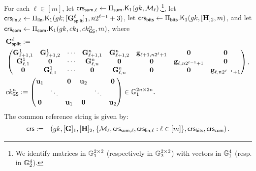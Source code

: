 \begin{description}
For each $\ell\in[m]$, let
\(\mathsf{crs}_{\mathsf{sum},\ell} \gets \Pi_{\mathsf{sum}}.\mathsf{K}_1({gk}, \mathcal{M}_\ell)\).\footnote{We identify
matrices in \(\mathbb{G}_1^{2 \times 2}\) (respectively in \(\mathbb{G}_2^{2 \times 2}\)) with vectors in \(\mathbb{G}_1^{4}\) (resp. in \(\mathbb{G}_2^{4}\)).}, let \(\mathsf{crs}_{\mathsf{lin},\ell}\gets \Pi_\mathsf{lin}.\mathsf{K}_1(gk;\allowbreak[\mathbf{{G}}^\ell_{\mathsf{split}}]_1,n2^{\ell-1}+3)\), let \(\mathsf{crs}_{\mathsf{bits}}\gets\Pi_{\mathsf{bits}}.\mathsf{K}_1(gk,[\mathbf{{H}}]_2,m)\), and let \(\mathsf{crs}_{\mathsf{com}} \gets \Pi_{\mathsf{com}}.\mathsf{K}_1({gk}, ck_1,ck_{\mathsf{GS}}^n,m)\), where
\begin{align*}
&\mathbf{{G}}_\mathsf{split}^\ell:=\\
&\begin{pmatrix}
\mathbf{{G}}^1_{\ell+1,1} & \mathbf{{G}}^1_{\ell+1,2} & \cdots & \mathbf{{G}}^n_{\ell+1,1} & \mathbf{{G}}^n_{\ell+1,2} & \mathbf{g}_{\ell+1,n2^\ell+1} & \mathbf{{0}}                       & \mathbf{{0}}\\
\mathbf{{G}}^1_{\ell,1}   & \mathbf{{0}}              & \cdots & \mathbf{{G}}^n_{\ell,n}   & \mathbf{{0}}              & \mathbf{{0}}                  & \mathbf{g}_{\ell,n2^{\ell-1}+1}  & \mathbf{{0}}\\
\mathbf{{0}}              & \mathbf{{G}}^1_{\ell,1}   & \cdots & \mathbf{{0}}              & \mathbf{{G}}^n_{\ell,n}   & \mathbf{{0}}                  & \mathbf{{0}}                       & \mathbf{g}_{\ell,n2^{\ell-1}+1}
\end{pmatrix},\\
&ck_{\mathsf{GS}}^n:=\left(\begin{matrix}
    \mathbf{u}_1 &        & \mathbf{0}   & \mathbf{u}_2 &        & \mathbf{0}\\
               & \ddots &            &            & \ddots &         \\
    \mathbf{0}   &        & \mathbf{u}_1 & \mathbf{0}   &        & \mathbf{u}_2
\end{matrix}\right)\in\mathbb{G}_1^{2n\times2n}.
\end{align*}
The common reference string is given by:
\begin{eqnarray*}
\mathsf{crs}&:=&\left( gk, [\mathbf{{G}}]_1,
    [\mathbf{{H}}]_2, \{\mathcal{M}_\ell,\mathsf{crs}_{\mathsf{sum},\ell},\mathsf{crs}_{\mathsf{lin},\ell}:\ell\in [m]\},\mathsf{crs}_{\mathsf{bits}},\mathsf{crs}_{\mathsf{com}} \right).
 \end{eqnarray*}



\end{description}
